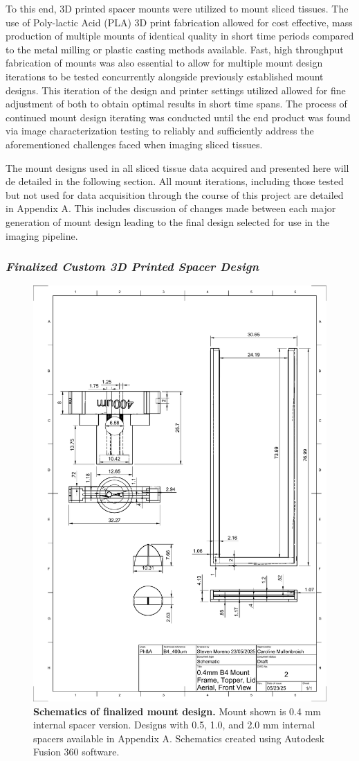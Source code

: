 To this end, 3D printed spacer mounts were utilized to mount sliced tissues. The use of Poly-lactic Acid (PLA) 3D print fabrication allowed for cost effective, mass production of multiple mounts of identical quality in short time periods compared to the metal milling or plastic casting methods available. Fast, high throughput fabrication of mounts was also essential to allow for multiple mount design iterations to be tested concurrently alongside previously established mount designs. This iteration of the design and printer settings utilized allowed for fine adjustment of both to obtain optimal results in short time spans. The process of continued mount design iterating was conducted until the end product was found via image characterization testing to reliably and sufficiently address the aforementioned challenges faced when imaging sliced tissues. 

The mount designs used in all sliced tissue data acquired and presented here will de detailed in the following section. All mount iterations, including those tested but not used for data acquisition through the course of this project are detailed in Appendix A. This includes discussion of changes made between each major generation of mount design leading to the final design selected for use in the imaging pipeline.


\subsubsection{\textit{Finalized Custom 3D Printed Spacer Design}}

\begin{figure}[H]
    \centering
    \includegraphics[width=0.5\linewidth]{Figures/0.4mm B4 Schematic v1.pdf}
    \caption{\textbf{Schematics of finalized mount design.} Mount shown is 0.4 mm internal spacer version. Designs with 0.5, 1.0, and 2.0 mm internal spacers available in Appendix A. Schematics created using Autodesk Fusion 360 software.}
    \label{fig:enter-label}
\end{figure}

